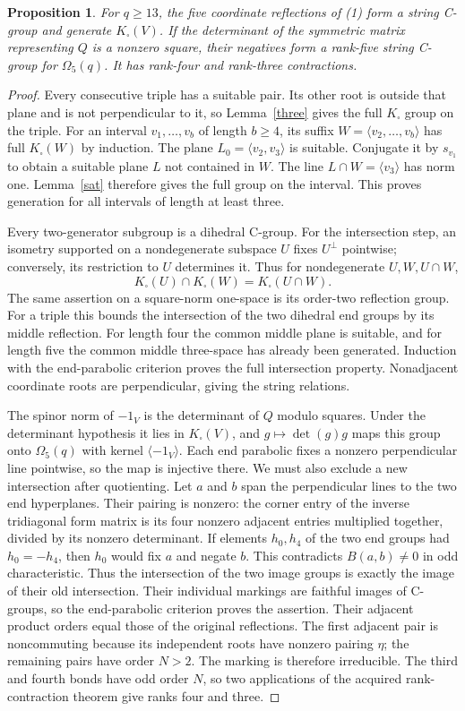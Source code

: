 \documentclass[11pt,a4paper]{article}
\newtheorem{proposition}[theorem]{Proposition}
\newcommand{\gen}[1]{\langle#1\rangle}
\newcommand{\Om}{\Omega}
\begin{document}
\begin{proposition}\label{path}
For $q\ge13$, the five coordinate reflections of (1) form a
string C-group and generate $K_\square(V)$. If the determinant
of the symmetric matrix representing $Q$ is a nonzero square,
their negatives form a rank-five string C-group for $\Om_5(q)$.
It has rank-four and rank-three contractions.
\end{proposition}
\begin{proof}
Every consecutive triple has a suitable pair. Its other root is
outside that plane and is not perpendicular to it, so
Lemma~\ref{three} gives the full $K_\square$ group on the triple.
For an interval $v_1,\ldots,v_b$ of length $b\ge4$, its suffix
$W=\gen{v_2,\ldots,v_b}$ has full $K_\square(W)$ by induction.
The plane $L_0=\gen{v_2,v_3}$ is suitable. Conjugate it by
$s_{v_1}$ to obtain a suitable plane $L$ not contained in $W$.
The line $L\cap W=\gen{v_3}$ has norm one. Lemma~\ref{sat}
therefore gives the full group on the interval. This proves
generation for all intervals of length at least three.

Every two-generator subgroup is a dihedral C-group. For the
intersection step, an isometry supported on a nondegenerate
subspace $U$ fixes $U^\perp$ pointwise; conversely, its restriction
to $U$ determines it. Thus for nondegenerate $U,W,U\cap W$,
\[
 K_\square(U)\cap K_\square(W)=K_\square(U\cap W).
\]
The same assertion on a square-norm one-space is its order-two
reflection group. For a triple this bounds the intersection of
the two dihedral end groups by its middle reflection. For length
four the common middle plane is suitable, and for length five
the common middle three-space has already been generated.
Induction with the end-parabolic criterion proves the full
intersection property. Nonadjacent coordinate roots are
perpendicular, giving the string relations.

The spinor norm of $-1_V$ is the determinant of $Q$ modulo
squares. Under the determinant hypothesis it lies in
$K_\square(V)$, and $g\mapsto\det(g)g$ maps this group onto
$\Om_5(q)$ with kernel $\gen{-1_V}$. Each end parabolic fixes
a nonzero perpendicular line pointwise, so the map is injective
there. We must also exclude a new intersection after quotienting.
Let $a$ and $b$ span the perpendicular lines to the two end
hyperplanes. Their pairing is nonzero: the corner entry of the
inverse tridiagonal form matrix is its four nonzero adjacent
entries multiplied together, divided by its nonzero determinant.
If elements $h_0,h_4$ of the two end groups had $h_0=-h_4$,
then $h_0$ would fix $a$ and negate $b$. This contradicts
$B(a,b)\ne0$ in odd characteristic. Thus the intersection of
the two image groups is exactly the image of their old intersection.
Their individual markings are faithful images of C-groups, so
the end-parabolic criterion proves the assertion. Their
adjacent product orders equal those of the original reflections.
The first adjacent pair is noncommuting because its independent
roots have nonzero pairing $\eta$; the remaining pairs have order
$N>2$. The marking is therefore irreducible. The third and fourth
bonds have odd order $N$, so two applications
of the acquired rank-contraction theorem give ranks four and three.
\end{proof}
\end{document}
